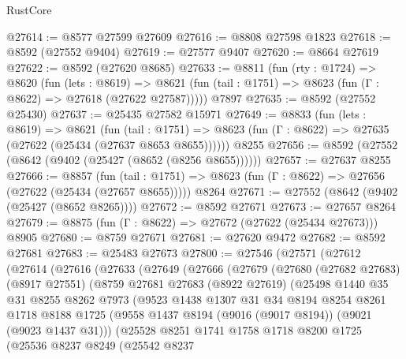 \begin{lexlean}{RustCore}
\begin{coremodule}
@27614 := @8577 @27599 @27609
@27616 := @8808 @27598 @1823
@27618 := @8592 (@27552 @9404)
@27619 := @27577 @9407
@27620 := @8664 @27619
@27622 := @8592 (@27620 @8685)
@27633 := @8811
    (fun (rty : @1724) =>
    @8620
      (fun (lets : @8619) =>
      @8621 (fun (tail : @1751) => @8623 (fun (Γ : @8622) => @27618 (@27622 @27587)))))
    @7897
@27635 := @8592 (@27552 @25430)
@27637 := @25435 @27582 @15971
@27649 := @8833
    (fun (lets : @8619) =>
    @8621
      (fun (tail : @1751) =>
      @8623 (fun (Γ : @8622) => @27635 (@27622 (@25434 (@27637 @8653 @8655))))))
    @8255
@27656 := @8592 (@27552 (@8642 (@9402 (@25427 (@8652 (@8256 @8655))))))
@27657 := @27637 @8255
@27666 := @8857
    (fun (tail : @1751) => @8623 (fun (Γ : @8622) => @27656 (@27622 (@25434 (@27657 @8655)))))
    @8264
@27671 := @27552 (@8642 (@9402 (@25427 (@8652 @8265))))
@27672 := @8592 @27671
@27673 := @27657 @8264
@27679 := @8875 (fun (Γ : @8622) => @27672 (@27622 (@25434 @27673))) @8905
@27680 := @8759 @27671
@27681 := @27620 @9472
@27682 := @8592 @27681
@27683 := @25483 @27673
@27800 := @27546
    (@27571
      (@27612
        (@27614
          (@27616
            (@27633
              (@27649
                (@27666
                  (@27679
                    (@27680
                      (@27682 @27683)
                      (@8917 @27551)
                      (@8759
                        @27681
                        @27683
                        (@8922 @27619)
                        (@25498
                          @1440
                          @35
                          @31
                          @8255
                          @8262
                          @7973
                          (@9523
                            @1438
                            @1307
                            @31
                            @34
                            @8194
                            @8254
                            @8261
                            @1718
                            @8188
                            @1725
                            (@9558 @1437 @8194 (@9016 (@9017 @8194)) (@9021 (@9023 @1437 @31)))
                            (@25528
                              @8251
                              @1741
                              @1758
                              @1718
                              @8200
                              @1725
                              (@25536
                                @8237
                                @8249
                                (@25542
                                  @8237

\end{coremodule}
\end{lexlean}
